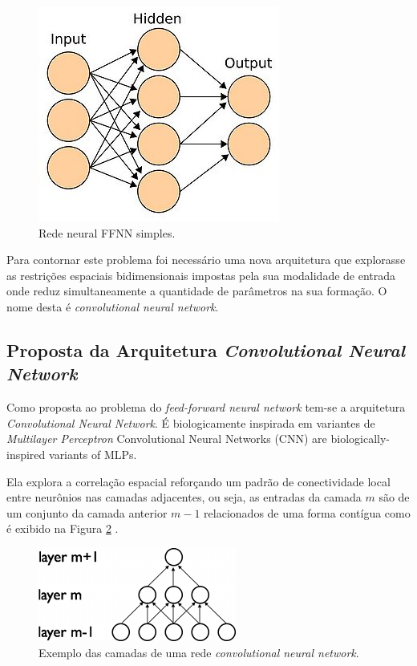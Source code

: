 \documentclass[10pt, conference]{IEEEtran}
\begin{document}
		\begin{figure}[H]
			\centering
			\includegraphics[width=0.8\linewidth]{img/ffnn.jpg}
			\caption{Rede neural FFNN simples.}
			\label{fig:ffnn.jpg}
		\end{figure}

		Para contornar este problema foi necessário uma nova arquitetura que explorasse as restrições espaciais bidimensionais impostas pela sua modalidade de entrada onde reduz simultaneamente a quantidade de parâmetros na sua formação. O nome desta é \textit{convolutional neural network}.


	\subsection{Proposta da Arquitetura \textit{Convolutional Neural Network}}
		Como proposta ao problema do \textit{feed-forward neural network} tem-se a arquitetura \textit{Convolutional Neural Network}. É biologicamente inspirada em variantes de \textit{Multilayer Perceptron} Convolutional Neural Networks (CNN) are biologically-inspired variants of MLPs.

		Ela explora a correlação espacial reforçando um padrão de conectividade local entre neurônios nas camadas adjacentes, ou seja, as entradas da camada $ m $ são de um conjunto da camada anterior $ m-1 $ relacionados de uma forma contígua como é exibido na Figura \ref{fig:layers_cnn} \cite{LeCun1998}.


		\begin{figure}[H]
			\centering
			\includegraphics[width=0.8\linewidth]{img/layers_cnn.png}
			\caption{Exemplo das camadas de uma rede \textit{convolutional neural network}.}
			\label{fig:layers_cnn}
		\end{figure}
\end{document}
